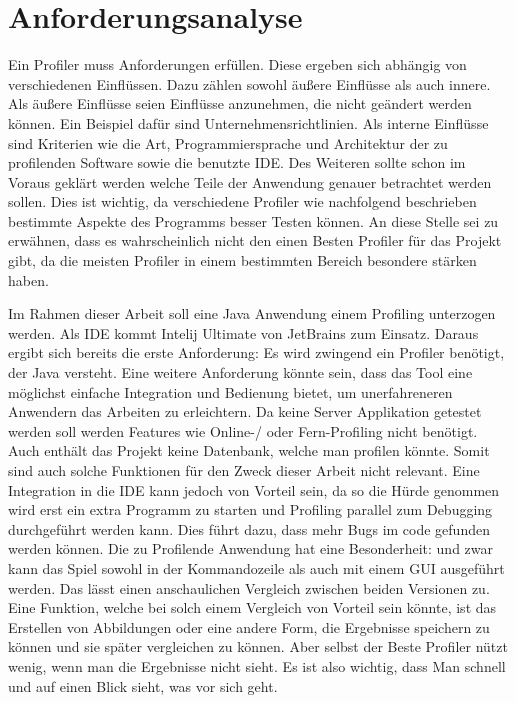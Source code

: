 \documentclass{article}
\begin{document}
\section{Anforderungsanalyse}
Ein Profiler muss Anforderungen erfüllen. Diese ergeben sich abhängig von verschiedenen Einflüssen. Dazu zählen sowohl äußere Einflüsse als auch innere. Als äußere Einflüsse seien Einflüsse anzunehmen, die nicht geändert werden können. Ein Beispiel dafür sind Unternehmensrichtlinien. Als interne Einflüsse sind Kriterien wie die Art, Programmiersprache und Architektur der zu profilenden Software sowie die benutzte IDE. Des Weiteren sollte schon im Voraus geklärt werden welche Teile der Anwendung genauer betrachtet werden sollen. Dies ist wichtig, da verschiedene Profiler wie nachfolgend beschrieben bestimmte Aspekte des Programms besser Testen können. An diese Stelle sei zu erwähnen, dass es wahrscheinlich nicht den einen Besten Profiler für das Projekt gibt, da die meisten Profiler in einem bestimmten Bereich besondere stärken haben. 


Im Rahmen dieser Arbeit soll eine Java Anwendung einem Profiling unterzogen werden. Als IDE kommt Intelij Ultimate von JetBrains zum Einsatz. Daraus ergibt sich bereits die erste Anforderung: Es wird zwingend ein Profiler benötigt, der Java versteht. Eine weitere Anforderung könnte sein, dass das Tool eine möglichst einfache Integration und Bedienung bietet, um unerfahreneren Anwendern das Arbeiten zu erleichtern. Da keine Server Applikation getestet werden soll werden Features wie Online-/ oder Fern-Profiling nicht benötigt. Auch enthält das Projekt keine Datenbank, welche man profilen könnte. Somit sind auch solche Funktionen für den Zweck dieser Arbeit nicht relevant. Eine Integration in die IDE kann jedoch von Vorteil sein, da so die Hürde genommen wird erst ein extra Programm zu starten und Profiling parallel zum Debugging durchgeführt werden kann. Dies führt dazu, dass mehr Bugs im code gefunden werden können. Die zu Profilende Anwendung hat eine Besonderheit: und zwar kann das Spiel sowohl in der Kommandozeile als auch mit einem GUI ausgeführt werden.
Das lässt einen anschaulichen Vergleich zwischen beiden Versionen zu. Eine Funktion, welche bei solch einem Vergleich von Vorteil sein könnte, ist das Erstellen von Abbildungen oder eine andere Form, die Ergebnisse speichern zu können und sie später vergleichen zu können.
Aber selbst der Beste Profiler nützt wenig, wenn man die Ergebnisse nicht sieht. Es ist also wichtig, dass Man schnell und auf einen Blick sieht, was vor sich geht.
\end{document}
